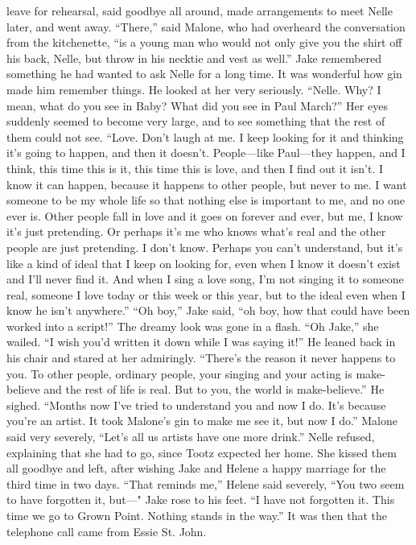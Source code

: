 \documentclass{novel}
\begin{document}
leave for rehearsal, said goodbye all around, made arrangements to meet Nelle later, and went away. “There,” said Malone, who had overheard the conversation from the kitchenette, “is a young man who would not only give you the shirt off his back, Nelle, but throw in his necktie and vest as well.” Jake remembered something he had wanted to ask Nelle for a long time. It was wonderful how gin made him remember things. He looked at her very seriously. “Nelle. Why? I mean, what do you see in Baby? What did you see in Paul March?” Her eyes suddenly seemed to become very large, and to see something that the rest of them could not see. “Love. Don’t laugh at me. I keep looking for it and thinking it’s going to happen, and then it doesn’t. People—like Paul—they happen, and I think, this time this is it, this time this is love, and then I find out it isn’t. I know it can happen, because it happens to other people, but never to me. I want someone to be my whole life so that nothing else is important to me, and no one ever is. Other people fall in love and it goes on forever and ever, but me, I know it’s just pretending. Or perhaps it’s me who knows what’s real and the other people are just pretending. I don’t know. Perhaps you can’t understand, but it’s like a kind of ideal that I keep on looking for, even when I know it doesn’t exist and I’ll never find it. And when I sing a love song, I’m not singing it to someone real, someone I love today or this week or this year, but to the ideal even when I know he isn’t anywhere.” “Oh boy,” Jake said, “oh boy, how that could have been worked into a script!” The dreamy look was gone in a flash. “Oh Jake,” she wailed. “I wish you’d written it down while I was saying it!” He leaned back in his chair and stared at her admiringly. “There’s the reason it never happens to you. To other people, ordinary people, your singing and your acting is make-believe and the rest of life is real. But to you, the world is make-believe.” He sighed. “Months now I've tried to understand you and now I do. It’s because you’re an artist. It took Malone’s gin to make me see it, but now I do.” Malone said very severely, “Let’s all us artists have one more drink.” Nelle refused, explaining that she had to go, since Tootz expected her home. She kissed them all goodbye and left, after wishing Jake and Helene a happy marriage for the third time in two days. “That reminds me,” Helene said severely, “You two seem to have forgotten it, but—" Jake rose to his feet. “I have not forgotten it. This time we go to Grown Point. Nothing stands in the way.” It was then that the telephone call came from Essie St. John.
\end{document}
